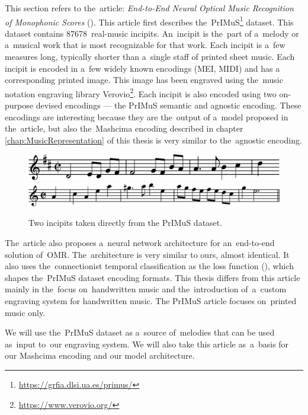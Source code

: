 This section refers to the~article: \emph{End-to-End Neural Optical Music Recognition of Monophonic Scores} (\cite{Primus}). This article first describes the~PrIMuS\footnote{\href{https://grfia.dlsi.ua.es/primus/}{https://grfia.dlsi.ua.es/primus/}} dataset. This dataset contains 87678~real-music incipits. An~incipit is the~part of a~melody or a~musical work that is most recognizable for that work. Each incipit is a~few measures long, typically shorter than a~single staff of printed sheet music. Each incipit is encoded in a~few widely known encodings (MEI, MIDI) and has a corresponding printed image. This image has been engraved using the~music notation engraving library Verovio\footnote{\href{https://www.verovio.org/}{https://www.verovio.org/}}. Each incipit is also encoded using two on-purpose devised encodings --- the PrIMuS semantic and agnostic encoding. These encodings are interesting because they are the~output of a~model proposed in the~article, but also the~Mashcima encoding described in chapter \ref{chap:MusicRepresentation} of this thesis is very similar to the~agnostic encoding.

\begin{figure}[h]
    \centering
    \includegraphics[width=120mm]{../img/primus-incipit}
    \\
    \medskip
    \includegraphics[width=140mm]{../img/primus-incipit-2}
    \caption{Two incipits taken directly from the PrIMuS dataset.}
    \label{fig2:PrimusIncipits}
\end{figure}

The~article also proposes a~neural network architecture for an~end-to-end solution of~OMR. The~architecture is very similar to ours, almost identical. It also uses the~connectionist temporal classification as the loss function (\cite{CTC}), which shapes the~PrIMuS dataset encoding formats. This thesis differs from this article mainly in the~focus on~handwritten music and the~introduction of~a~custom engraving system for handwritten music. The PrIMuS article focuses on~printed music only.

We will use the~PrIMuS dataset as a~source of~melodies that can be used as~input to~our engraving system. We will also take this article as~a~basis for our Mashcima encoding and our model architecture.


